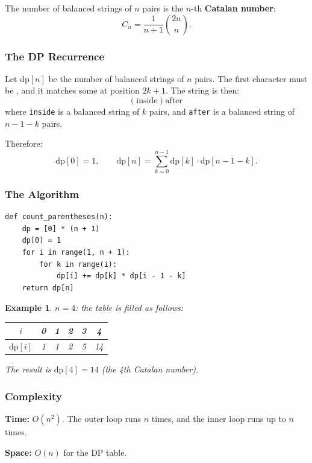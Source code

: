 \documentclass[11pt,a4paper]{article}
\newtheorem{example}[theorem]{Example}
\newcommand{\code}[1]{\texttt{\detokenize{#1}}}
\begin{document}
The number of balanced strings of \(n\) pairs is the \(n\)-th \textbf{Catalan number}:
\[
C_n = \frac{1}{n+1} \binom{2n}{n}.
\]

\subsubsection{The DP Recurrence}

Let \(\mathrm{dp}[n]\) be the number of balanced strings of \(n\) pairs. The first character must be \code{(}, and it matches some \code{)} at position \(2k+1\). The string is then:
\[
\texttt{(} \; \text{inside} \; \texttt{)} \; \text{after}
\]
where \texttt{inside} is a balanced string of \(k\) pairs, and \texttt{after} is a balanced string of \(n-1-k\) pairs.

Therefore:
\[
\mathrm{dp}[0] = 1, \qquad \mathrm{dp}[n] = \sum_{k=0}^{n-1} \mathrm{dp}[k] \cdot \mathrm{dp}[n-1-k].
\]

\subsubsection{The Algorithm}

\begin{lstlisting}
def count_parentheses(n):
    dp = [0] * (n + 1)
    dp[0] = 1
    for i in range(1, n + 1):
        for k in range(i):
            dp[i] += dp[k] * dp[i - 1 - k]
    return dp[n]
\end{lstlisting}

\begin{example}
\(n = 4\): the table is filled as follows:
\begin{center}
\begin{tabular}{c|ccccc}
\toprule
\(i\) & 0 & 1 & 2 & 3 & 4 \\
\midrule
\(\mathrm{dp}[i]\) & 1 & 1 & 2 & 5 & 14 \\
\bottomrule
\end{tabular}
\end{center}
The result is \(\mathrm{dp}[4] = 14\) (the 4th Catalan number).
\end{example}

\subsubsection{Complexity}

\textbf{Time:} \(O(n^2)\). The outer loop runs \(n\) times, and the inner loop runs up to \(n\) times.

\textbf{Space:} \(O(n)\) for the DP table.
\end{document}
